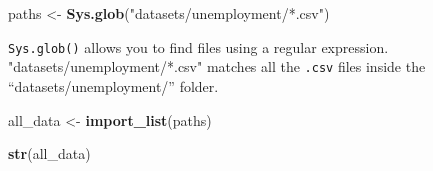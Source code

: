 \documentclass[
]{article}
\newenvironment{Shaded}{\begin{snugshade}}{\end{snugshade}}
\newcommand{\KeywordTok}[1]{\textcolor[rgb]{0.13,0.29,0.53}{\textbf{#1}}}
\newcommand{\NormalTok}[1]{#1}
\newcommand{\StringTok}[1]{\textcolor[rgb]{0.31,0.60,0.02}{#1}}
\begin{document}
\begin{Shaded}
\begin{Highlighting}[]
\NormalTok{paths \textless{}{-}}\StringTok{ }\KeywordTok{Sys.glob}\NormalTok{(}\StringTok{"datasets/unemployment/*.csv"}\NormalTok{)}
\end{Highlighting}
\end{Shaded}

\texttt{Sys.glob()} allows you to find files using a regular expression. "datasets/unemployment/*.csv"
matches all the \texttt{.csv} files inside the ``datasets/unemployment/'' folder.

\begin{Shaded}
\begin{Highlighting}[]
\NormalTok{all\_data \textless{}{-}}\StringTok{ }\KeywordTok{import\_list}\NormalTok{(paths)}

\KeywordTok{str}\NormalTok{(all\_data)}
\end{Highlighting}
\end{Shaded}
\end{document}
